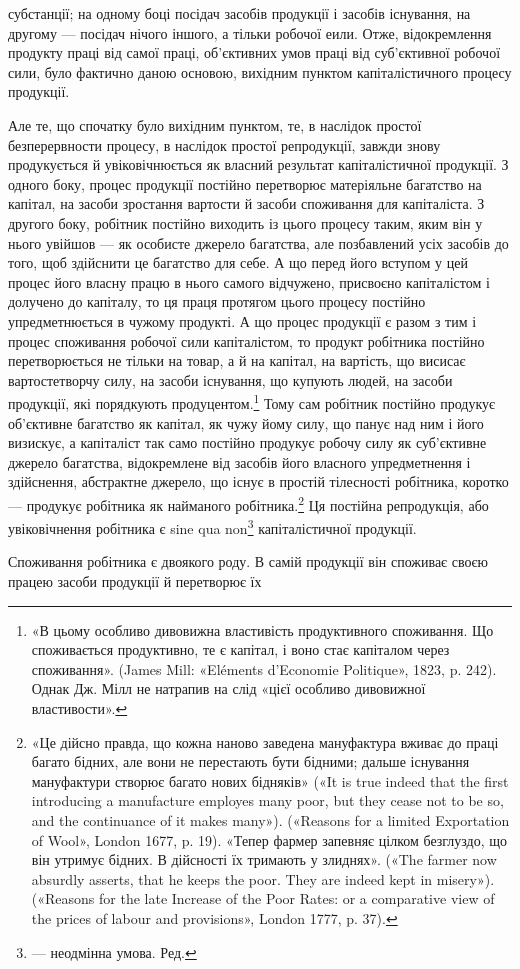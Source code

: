 субстанції; на одному боці посідач засобів продукції і засобів
існування, на другому — посідач нічого іншого, а тільки робочої
еили. Отже, відокремлення продукту праці від самої праці, об’єктивних
умов праці від суб’єктивної робочої сили, було фактично
даною основою, вихідним пунктом капіталістичного процесу
продукції.

Але те, що спочатку було вихідним пунктом, те, в наслідок
простої безперервности процесу, в наслідок простої репродукції,
завжди знову продукується й увіковічнюється як власний результат
капіталістичної продукції. З одного боку, процес продукції
постійно перетворює матеріяльне багатство на капітал,
на засоби зростання вартости й засоби споживання для капіталіста.
З другого боку, робітник постійно виходить із цього процесу
таким, яким він у нього увійшов — як особисте джерело
багатства, але позбавлений усіх засобів до того, щоб здійснити
це багатство для себе. А що перед його вступом у цей процес
його власну працю в нього самого відчужено, присвоєно капіталістом
і долучено до капіталу, то ця праця протягом цього процесу
постійно упредметнюється в чужому продукті. А що процес
продукції є разом з тим і процес споживання робочої сили капіталістом,
то продукт робітника постійно перетворюється не
тільки на товар, а й на капітал, на вартість, що висисає вартостетворчу
силу, на засоби існування, що купують людей, на засоби
продукції, які порядкують продуцентом.\footnote{
«В цьому особливо дивовижна властивість продуктивного споживання.
Що споживається продуктивно, те є капітал, і воно стає капіталом
через споживання». (James Mill: «Eléments d’Economie Politique», 1823,
p. 242). Однак Дж. Мілл не натрапив на слід «цієї особливо дивовижної
властивости».
} Тому сам робітник
постійно продукує об’єктивне багатство як капітал, як чужу
йому силу, що панує над ним і його визискує, а капіталіст так
само постійно продукує робочу силу як суб’єктивне джерело
багатства, відокремлене від засобів його власного упредметнення
і здійснення, абстрактне джерело, що існує в простій тілесності
робітника, коротко — продукує робітника як найманого робітника.\footnote{
«Це дійсно правда, що кожна наново заведена мануфактура вживає
до праці багато бідних, але вони не перестають бути бідними; дальше
існування мануфактури створює багато нових бідняків» («It is true indeed
that the first introducing a manufacture employes many poor, but
they cease not to be so, and the continuance of it makes many»). («Reasons
for a limited Exportation of Wool», London 1677, p. 19). «Тепер фармер
запевняє цілком безглуздо, що він утримує бідних. В дійсності їх тримають
у злиднях». («The farmer now absurdly asserts, that he keeps the
poor. They are indeed kept in misery»). («Reasons for the late Increase
of the Poor Rates: or a comparative view of the prices of labour and provisions»,
London 1777, p. 37).
}
Ця постійна репродукція, або увіковічнення робітника
є sine qua non\footnote*{
— неодмінна умова. Ред.
} капіталістичної продукції.

Споживання робітника є двоякого роду. В самій продукції
він споживає своєю працею засоби продукції й перетворює їх